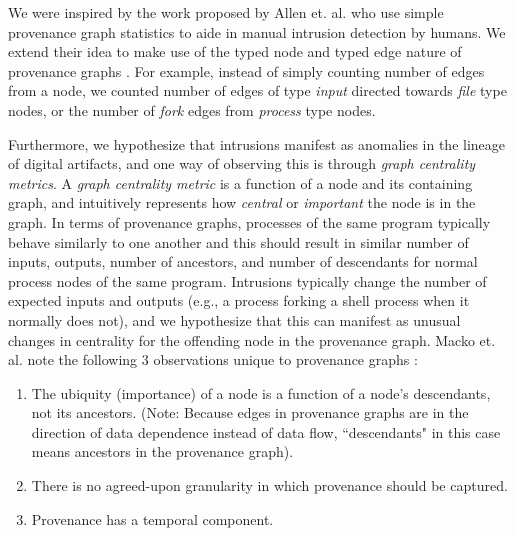 \documentclass[10pt,twocolumn]{article}
\begin{document}
We were inspired by the work proposed by Allen et. al. who use simple provenance graph statistics to aide
in manual intrusion detection by humans. We extend their idea to make use of the typed node and typed edge
nature of provenance graphs \cite{provstat}. For example, instead of simply counting number of edges from a node, we
counted number of edges of type {\em input} directed towards {\em file} type nodes, or the number of {\em fork}
edges from {\em process} type nodes.

Furthermore, we hypothesize that intrusions manifest as anomalies in the lineage of digital artifacts, and
one way of observing this is through {\em graph centrality metrics}. A {\em graph centrality metric} is a function
of a node and its containing graph, and intuitively represents how {\em central} or {\em important} the node
is in the graph. In terms of provenance graphs, processes of the same program typically behave similarly to one another
and this should result in similar number of inputs, outputs, number of ancestors, and number of descendants for normal
process nodes of the same program.
Intrusions typically change the number of expected inputs and outputs (e.g., a process forking a shell process
when it normally does not), and we hypothesize that this can manifest as unusual changes in centrality
for the offending node in the provenance graph. Macko et. al. note the following 3 observations unique to provenance graphs \cite{clustering}:
\begin{enumerate}
\item The ubiquity (importance) of a node is a function of a node's descendants, not its ancestors. (Note: Because edges in provenance graphs are in the direction of data dependence instead of data flow, ``descendants" in this case means ancestors in the provenance graph).
\item There is no agreed-upon granularity in which provenance should be captured.
\item Provenance has a temporal component.
\end{enumerate}
\end{document}
